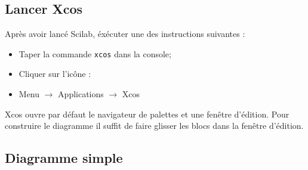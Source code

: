 \subsection{Lancer Xcos}
Après avoir lancé Scilab, éxécuter une des instructions suivantes :
\begin{itemize}
    \item Taper la commande \verb?xcos? dans la console;
    \item Cliquer sur l'icône : 
    \item Menu $\rightarrow$ Applications $\rightarrow$ Xcos
\end{itemize}

Xcos ouvre par défaut le navigateur de palettes et une fenêtre d'édition. 
Pour construire le diagramme il suffit de faire glisser les blocs dans la 
fenêtre d'édition.

\subsection{Diagramme simple}

